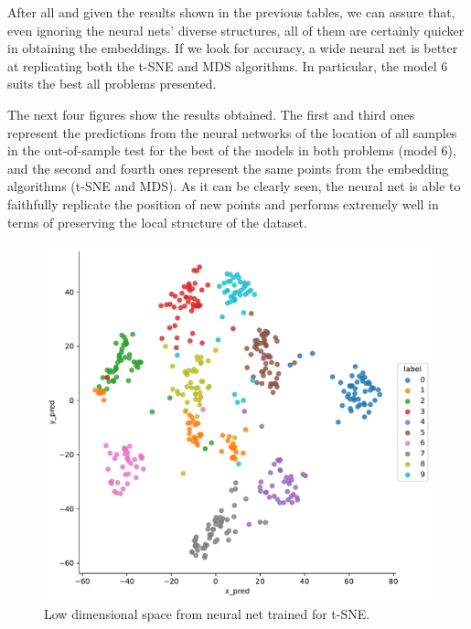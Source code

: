 \documentclass[a4paper,11pt,spanish]{report}
\begin{document}
After all and given the results shown in the previous tables, we can assure that, even ignoring the neural nets' diverse structures, all of them are certainly quicker in obtaining the embeddings. If we look for accuracy, a wide neural net is better at replicating both the t-SNE and MDS algorithms. In particular, the model 6 suits the best all problems presented.

The next four figures show the results obtained. The first and third ones represent the predictions from the neural networks of the location of all samples in the out-of-sample test for the best of the models in both problems (model 6), and the second and fourth ones represent the same points from the embedding algorithms (t-SNE and MDS). As it can be clearly seen, the neural net is able to faithfully replicate the position of new points and performs extremely well in terms of preserving the local structure of the dataset.

\begin{figure}[p]
\centering
\includegraphics[width=12cm]{figures/app1plotpredictions.pdf}
\caption{\label{figureNN1}Low dimensional space from neural net trained for t-SNE.}
\end{figure}
\end{document}
